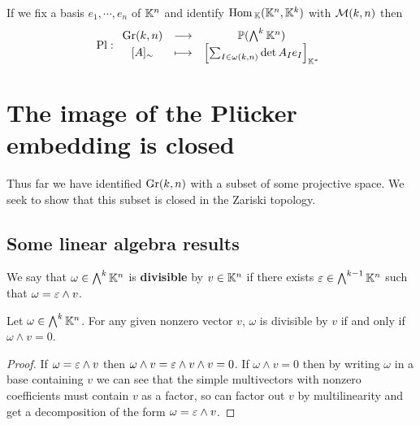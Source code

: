 \begin{remark}
If we fix a basis $e_1,\cdots, e_n$ of $\mathbb{K}^n$ and identify $\mathrm{Hom}\,_{\mathbb{K}}(\mathbb{K}^n,\mathbb{K}^k)$ with $\mathcal{M}(k,n)$  then
\[\mathrm{Pl}:\begin{array}{ccc} {\mathrm{Gr}(k,n)} & \longrightarrow & {\mathbb{P}(\bigwedge^k\mathbb{K}^n)}\\ {[A]_\sim} & \longmapsto & {\left[{\sum_{I\in \omega(k,n)}\det A_I e_I}\right]_{\mathbb{K}^\ast}} \end{array}\]
\end{remark}



\section{The image of the Pl\"ucker embedding is closed}\label{ImagePluckerEmbeddingIsClosed}
Thus far we have identified $\mathrm{Gr}(k,n)$ with a subset of some projective space. We seek to show that this subset is closed in the Zariski topology.

\subsection{Some linear algebra results}
\begin{definition}[Divisibility]
We say that $\omega\in \bigwedge^k\mathbb{K}^n$ is \textbf{divisible} by $v\in\mathbb{K}^n$ if there exists $\varepsilon\in \bigwedge^{k-1}\mathbb{K}^n$ such that $\omega=\varepsilon\wedge v$.
\end{definition}
\begin{lemma}\label{Divisibility}
Let $\omega\in \bigwedge^k\mathbb{K}^n$. For any given nonzero vector $v$, $\omega$ is divisible by $v$ if and only if $\omega\wedge v=0$.
\end{lemma}
\begin{proof}
If $\omega=\varepsilon\wedge v$ then $\omega\wedge v=\varepsilon\wedge v\wedge v=0$. If $\omega\wedge v=0$ then by writing $\omega$ in a base containing $v$ we can see that the simple multivectors with nonzero coefficients must contain $v$ as a factor, so can factor out $v$ by multilinearity and get a decomposition of the form $\omega=\varepsilon\wedge v$.
\end{proof}

